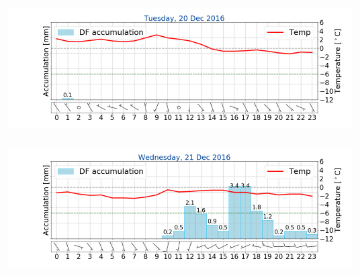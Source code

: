 \begin{figure}[h!]
	\centering
	\begin{subfigure}[b]{0.49\textwidth}
		\includegraphics[trim={4.9cm 1.cm 1.5cm 1cm},clip,
		width=\textwidth]{./fig_weathermast/T_P_U_20161220}
		\caption{}\label{fig:TPU20}
	\end{subfigure}
	\hfill
	\begin{subfigure}[b]{0.49\textwidth}
		\includegraphics[trim={4.9cm 1.cm 1.5cm 1cm},clip,
		width=\textwidth]{./fig_weathermast/T_P_U_20161221}
		\caption{}\label{fig:TPU21}
	\end{subfigure}
\end{figure}
